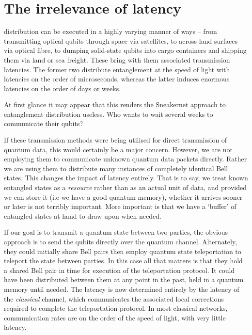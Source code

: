 %
%

\section{The irrelevance of latency}

 distribution can be executed in a highly varying manner of ways -- from transmitting optical qubits through space via satellites, to across land surfaces via optical fibre, to dumping solid-state qubits into cargo containers and shipping them via land or sea freight. These bring with them associated transmission latencies. The former two distribute entanglement at the speed of light with latencies on the order of microseconds, whereas the latter induces enormous latencies on the order of days or weeks.

At first glance it may appear that this renders the Sneakernet\texttrademark{} approach to entanglement distribution useless. Who wants to wait several weeks to communicate their qubits?

If these transmission methods were being utilised for direct transmission of quantum data, this would certainly be a major concern. However, we are not employing them to communicate unknown quantum data packets directly. Rather we are using them to distribute many instances of completely identical Bell states. This changes the impact of latency entirely. That is to say, we treat known entangled states as a \textit{resource} rather than as an actual unit of data, and provided we can store it (i.e we have a good quantum memory), whether it arrives sooner or later is not terribly important. More important is that we have a `buffer' of entangled states at hand to draw upon when needed.

If our goal is to transmit a quantum state between two parties, the obvious approach is to send the qubits directly over the quantum channel. Alternately, they could initially share Bell pairs then employ quantum state teleportation to teleport the state between parties. In this case all that matters is that they hold a shared Bell pair in time for execution of the teleportation protocol. It could have been distributed between them at any point in the past, held in a quantum memory until needed. The latency is now determined entirely by the latency of the \textit{classical} channel, which communicates the associated local corrections required to complete the teleportation protocol. In most classical networks, communication rates are on the order of the speed of light, with very little latency.


